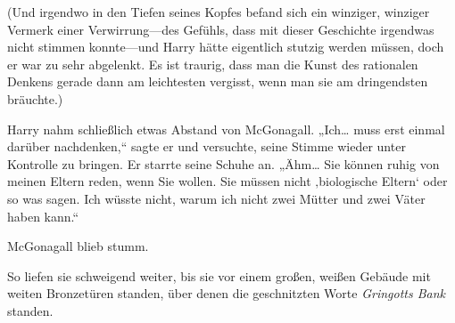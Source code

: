 (Und irgendwo in den Tiefen seines Kopfes befand sich ein winziger, winziger Vermerk einer Verwirrung—des Gefühls, dass mit dieser Geschichte irgendwas nicht stimmen konnte—und Harry hätte eigentlich stutzig werden müssen, doch er war zu sehr abgelenkt. Es ist traurig, dass man die Kunst des rationalen Denkens gerade dann am leichtesten vergisst, wenn man sie am dringendsten bräuchte.)

Harry nahm schließlich etwas Abstand von McGonagall. „Ich… muss erst einmal darüber nachdenken,“ sagte er und versuchte, seine Stimme wieder unter Kontrolle zu bringen. Er starrte seine Schuhe an. „Ähm… Sie können ruhig von meinen Eltern reden, wenn Sie wollen. Sie müssen nicht ‚biologische Eltern‘ oder so was sagen. Ich wüsste nicht, warum ich nicht zwei Mütter und zwei Väter haben kann.“

McGonagall blieb stumm.

So liefen sie schweigend weiter, bis sie vor einem großen, weißen Gebäude mit weiten Bronzetüren standen, über denen die geschnitzten Worte \emph{Gringotts Bank} standen.

